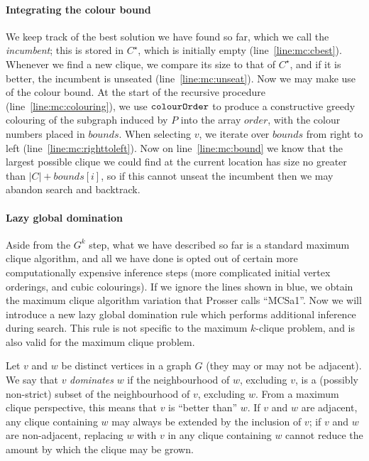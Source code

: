 \documentclass[letterpaper]{article}
\newcommand{\mcline}[1]{line~\ref{line:mc:#1}}
\newcommand{\Cbest}{C^\star}
\newcommand{\bounds}{\mathit{bounds}}
\newcommand{\order}{\mathit{order}}
\newcommand{\colourOrder}{\FuncSty{colourOrder}}
\begin{document}
\paragraph{Integrating the colour bound}

We keep track of the best solution we have found so far, which we call the \emph{incumbent}; this is
stored in $\Cbest$, which is initially empty (\mcline{cbest}). Whenever we find a new clique, we
compare its size to that of $\Cbest$, and if it is better, the incumbent is unseated
(\mcline{unseat}). Now we may make use of the colour bound. At the start of the recursive procedure
(\mcline{colouring}), we use $\colourOrder$ to produce a constructive greedy colouring of the
subgraph induced by $P$ into the array $\order$, with the colour numbers placed in $\bounds$. When
selecting $v$, we iterate over $\bounds$ from right to left (\mcline{righttoleft}). Now on
\mcline{bound} we know that the largest possible clique we could find at the current location has
size no greater than $|C| + \bounds[i]$, so if this cannot unseat the incumbent then we may abandon
search and backtrack.

\paragraph{Lazy global domination}

Aside from the $G^k$ step, what we have described so far is a standard maximum clique algorithm, and
all we have done is opted out of certain more computationally expensive inference steps (more
complicated initial vertex orderings, and cubic colourings). If we ignore the lines shown in blue,
we obtain the maximum clique algorithm variation that Prosser \cite{Prosser:2012} calls ``MCSa1''.
Now we will introduce a new lazy global domination rule which performs additional inference during
search. This rule is not specific to the maximum $k$-clique problem, and is also valid for the
maximum clique problem.

Let $v$ and $w$ be distinct vertices in a graph $G$ (they may or may not be adjacent). We say that
$v$ \emph{dominates} $w$ if the neighbourhood of $w$, excluding $v$, is a (possibly non-strict)
subset of the neighbourhood of $v$, excluding $w$. From a maximum clique perspective, this means
that $v$ is ``better than'' $w$. If $v$ and $w$ are adjacent, any clique containing $w$ may always
be extended by the inclusion of $v$; if $v$ and $w$ are non-adjacent, replacing $w$ with $v$ in any
clique containing $w$ cannot reduce the amount by which the clique may be grown.
\end{document}
